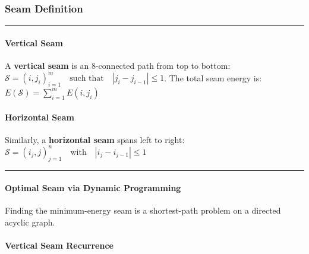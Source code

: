\documentclass[11pt]{article}
\begin{document}
    \hypertarget{seam-definition}{%
\subsubsection{\texorpdfstring{\textbf{Seam
Definition}}{Seam Definition}}\label{seam-definition}}

\begin{center}\rule{0.5\linewidth}{0.5pt}\end{center}

\hypertarget{vertical-seam}{%
\paragraph{\texorpdfstring{\textbf{Vertical
Seam}}{Vertical Seam}}\label{vertical-seam}}

A \textbf{vertical seam} is an \(8\)-connected path from top to bottom:
\(\mathcal{S} = {(i, j_i)}_{i=1}^{m} \quad \text{such that} \quad |j_i - j_{i-1}| \le 1\).
The total seam energy is:
\(E(\mathcal{S}) = \sum\limits_{i=1}^{m} E(i, j_i)\)

\hypertarget{horizontal-seam}{%
\paragraph{\texorpdfstring{\textbf{Horizontal
Seam}}{Horizontal Seam}}\label{horizontal-seam}}

Similarly, a \textbf{horizontal seam} spans left to right:
\(\mathcal{S} = {(i_j, j)}_{j=1}^{n} \quad \text{with} \quad |i_j - i_{j-1}| \le 1\)

\begin{center}\rule{0.5\linewidth}{0.5pt}\end{center}

\hypertarget{optimal-seam-via-dynamic-programming}{%
\paragraph{\texorpdfstring{\textbf{Optimal Seam via Dynamic
Programming}}{Optimal Seam via Dynamic Programming}}\label{optimal-seam-via-dynamic-programming}}

Finding the minimum-energy seam is a shortest-path problem on a directed
acyclic graph.

\hypertarget{vertical-seam-recurrence}{%
\paragraph{\texorpdfstring{\textbf{Vertical Seam
Recurrence}}{Vertical Seam Recurrence}}\label{vertical-seam-recurrence}}
\end{document}
